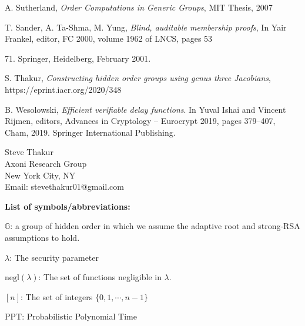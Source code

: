 \documentclass[11pt, lettersize, notitlepage, leqno, footskip=0.6cm]{article}
\newcommand{\negl}{\mr{negl}}
\newcommand{\mb}{\mathbb}
\newcommand{\mr}{\mathrm}
\newcommand{\lam}{\lambda}
\newcommand{\noin}{\noindent}
\numberwithin{equation}{section}
\begin{document}
\noindent [Sut07] A. Sutherland, \textit{Order Computations in Generic Groups}, MIT Thesis, 2007 \vspace{0.1cm}

\noindent [STY01] T. Sander, A. Ta-Shma, M. Yung, \textit{Blind, auditable membership proofs}, In Yair Frankel, editor, FC 2000, volume 1962 of LNCS, pages 53{71. Springer, Heidelberg, February 2001.\vspace{0.1cm}


\noindent [Th20] S. Thakur, \textit{Constructing hidden order groups using genus three Jacobians}, https://eprint.iacr.org/2020/348\vspace{0.1cm} 

\noindent [Wes19] B. Wesolowski, \textit{Efficient verifiable delay functions}. In Yuval Ishai and Vincent Rijmen, editors, Advances in Cryptology – Eurocrypt 2019, pages 379–407, Cham, 2019. Springer International Publishing.\vspace{0.1cm}




\bigskip

\normalsize
\noindent Steve Thakur\\
Axoni Research Group\\
New York City, NY\\
Email: stevethakur01@gmail.com


\newpage


\begin{center}\textbf{List of symbols/abbreviations:}\end{center}

\noindent $\mb{G}$: a group of hidden order in which we assume the adaptive root and strong-RSA assumptions to hold. \vspace{0.1cm}

\noindent $\lam$: The security parameter \vspace{0.1cm}

\noindent $\negl(\lam)$: The set of functions negligible in $\lam$. \vspace{0.1cm}

\noindent $[n]$: The set of integers $\{0,1,\cdots,n-1 \}$ \vspace{0.1cm}

\noin PPT: Probabilistic Polynomial Time \vspace{0.1cm}

}
\end{document}
